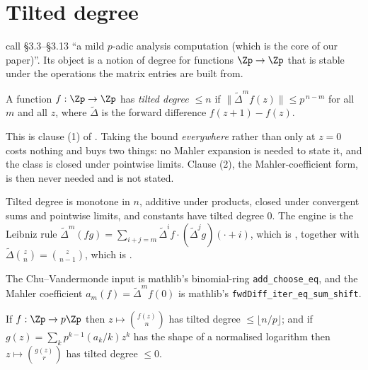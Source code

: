 \section{Tilted degree}

\cite{LWX} call \S3.3--\S3.13 ``a mild $p$-adic analysis computation (which is the core of our
paper)''.  Its object is a notion of degree for functions $\Zp\to\Zp$ that is stable under the
operations the matrix entries are built from.

\begin{definition}
  \label{def:tilteddeg}
  \leanok
  A function $f : \Zp\to\Zp$ has \emph{tilted degree $\leq n$} if
  $\lVert \tilde\Delta^{m}f(z)\rVert \leq p^{\,n-m}$ for all $m$ and all $z$, where
  $\tilde\Delta$ is the forward difference $f(z+1)-f(z)$.
\end{definition}

This is clause (1) of \cite[Definition-Proposition 3.8]{LWX}.  Taking the bound
\emph{everywhere} rather than only at $z=0$ costs nothing and buys two things: no Mahler
expansion is needed to state it, and the class is closed under pointwise limits.  Clause (2),
the Mahler-coefficient form, is then never needed and is not stated.

\begin{lemma}
  \label{lem:tilted-calculus}
  \leanok
  Tilted degree is monotone in $n$, additive under products, closed under convergent sums and
  pointwise limits, and constants have tilted degree $0$.  The engine is the Leibniz rule
  $\tilde\Delta^{m}(fg) = \sum_{i+j=m}\tilde\Delta^{i}f \cdot (\tilde\Delta^{j}g)(\cdot + i)$,
  which is \cite[(3.5.1)]{LWX}, together with
  $\tilde\Delta\binom{z}{n} = \binom{z}{n-1}$, which is \cite[(3.5.2)]{LWX}.
\end{lemma}

The Chu--Vandermonde input \cite[(3.5.3)]{LWX} is mathlib's binomial-ring
\texttt{add\_choose\_eq}, and the Mahler coefficient $a_m(f) = \tilde\Delta^{m}f(0)$ is mathlib's
\texttt{fwdDiff\_iter\_eq\_sum\_shift}.

\begin{lemma}
  \label{lem:tilted-binomial}
  \leanok
  If $f : \Zp\to p\Zp$ then $z\mapsto\binom{f(z)}{n}$ has tilted degree $\leq \lfloor n/p\rfloor$;
  and if $g(z) = \sum_k p^{k-1}(a_k/k)z^{k}$ has the shape of a normalised logarithm then
  $z\mapsto\binom{g(z)}{r}$ has tilted degree $\leq 0$.
\end{lemma}

